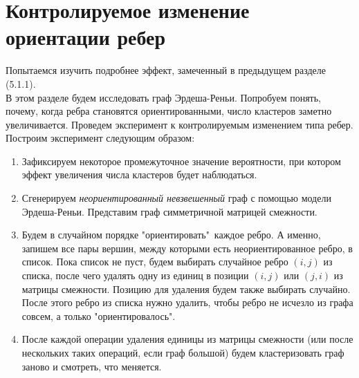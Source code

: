 \newpage
\section{Контролируемое изменение ориентации ребер}
Попытаемся изучить подробнее эффект, замеченный в предыдущем разделе (5.1.1).\\

В этом разделе будем исследовать граф Эрдеша-Реньи. Попробуем понять, почему, когда ребра становятся ориентированными, число кластеров заметно увеличивается. Проведем эксперимент к контролируемым изменением типа ребер. Построим эксперимент следующим образом:

\begin{enumerate}
	\item Зафиксируем некоторое промежуточное значение вероятности, при котором эффект увеличения числа кластеров будет наблюдаться. 
	
	\item Сгенерируем \textit{неориентированный невзвешенный} граф с помощью модели Эрдеша-Реньи. Представим граф симметричной матрицей смежности.
	
	\item Будем в случайном порядке "ориентировать"\ каждое ребро. А именно, запишем все пары вершин, между которыми есть неориентированное ребро, в список. Пока список не пуст, будем выбирать случайное ребро $(i, j)$ из списка, после чего удалять одну из единиц в позиции $(i,j)$ или $(j,i)$ из матрицы смежности. Позицию для удаления будем также выбирать случайно. После этого ребро из списка нужно удалить, чтобы ребро не исчезло из графа совсем, а только "ориентировалось".
	
	\item После каждой операции удаления единицы из матрицы смежности (или после нескольких таких операций, если граф большой) будем кластеризовать граф заново и смотреть, что меняется.
	
\end{enumerate}